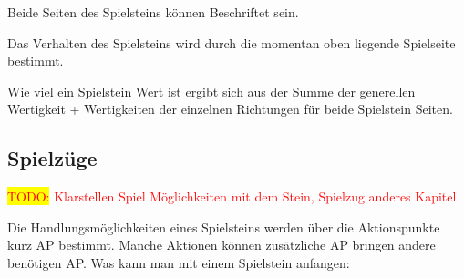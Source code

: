 \documentclass{article}
\newcommand{\todo}[1]{\textcolor{red}{\colorbox{yellow}{TODO:} #1\\}}
\begin{document}
    \begin{flushleft}
    
    Beide Seiten des Spielsteins können Beschriftet sein.
    
	Das Verhalten des Spielsteins wird durch die momentan oben liegende Spielseite bestimmt.
	
	
	Wie viel ein Spielstein Wert ist ergibt sich aus der Summe der generellen Wertigkeit + Wertigkeiten der einzelnen Richtungen für beide Spielstein Seiten.
	\end{flushleft}
	
	
	
	
\subsection{Spielzüge}

	\todo{Klarstellen Spiel Möglichkeiten mit dem Stein, Spielzug anderes Kapitel}


	Die Handlungsmöglichkeiten eines Spielsteins werden über die Aktionspunkte kurz AP bestimmt.
	Manche Aktionen können zusätzliche AP bringen andere benötigen AP.
	Was kann man mit einem Spielstein anfangen:
\end{document}
